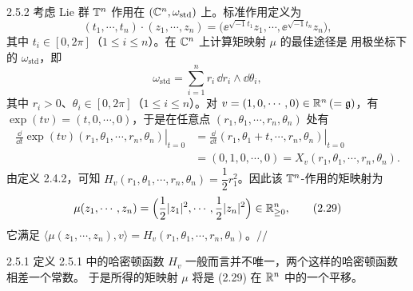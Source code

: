 \begin{wexam}{2.5.2}
考虑 Lie 群 $\mathbb{T}^n$ 作用在 $(\mathbb{C}^n,\omega_{\mathrm{std}})$ 上。标准作用定义为
\begin{equation}
  (t_1,\cdots,t_n)\cdot(z_1,\cdots,z_n)
  =\big(\ee^{\sqrt{-1}t_1}z_1,\cdots,\ee^{\sqrt{-1}t_n}z_n\big),
  \tag{2.27}
\end{equation}
其中 $t_i\in[0,2\pi]$（$1\le i\le n$）。在 $\mathbb{C}^n$ 上计算矩映射 $\mu$ 的最佳途径是
用极坐标下的 $\omega_{\mathrm{std}}$，即
\begin{equation}
  \omega_{\mathrm{std}}=\sum_{i=1}^nr_i\,\dd r_i\wedge\dd\theta_i,
  \tag{2.28}
\end{equation}
其中 $r_i>0$、$\theta_i\in[0,2\pi]$（$1\le i\le n$）。对
$v=(1,0,\cdots,0)\in\mathbb{R}^n\,(=\mathfrak{g})$，有 $\exp(tv)=(t,0,\cdots,0)$，于是在任意点
$(r_1,\theta_1,\cdots,r_n,\theta_n)$ 处有
\begin{align*}
  \left.\frac{\dd}{\dd t}\exp(tv)(r_1,\theta_1,\cdots,r_n,\theta_n)\right|_{t=0}
  &=\left.\frac{\dd}{\dd t}(r_1,\theta_1+t,\cdots,r_n,\theta_n)\right|_{t=0}\\
  &=(0,1,0,\cdots,0)=X_v(r_1,\theta_1,\cdots,r_n,\theta_n).
\end{align*}
由定义 2.4.2，可知 $H_v(r_1,\theta_1,\cdots,r_n,\theta_n)=\dfrac12r_1^2$。因此该
$\mathbb{T}^n$-作用的矩映射为
\begin{equation}
  \mu(z_1,\cdots,z_n)
  =\Big(\frac12|z_1|^2,\cdots,\frac12|z_n|^2\Big)\in\mathbb{R}^n_{\ge0},
  \tag{2.29}
\end{equation}
它满足
$\langle\mu(z_1,\cdots,z_n),v\rangle=H_v(r_1,\theta_1,\cdots,r_n,\theta_n)$。\hfill$//$
\end{wexam}

\begin{wrem}{2.5.1}
定义 2.5.1 中的哈密顿函数 $H_v$ 一般而言并不唯一，两个这样的哈密顿函数相差一个常数。
于是所得的矩映射 $\mu$ 将是 (2.29) 在 $\mathbb{R}^n$ 中的一个平移。
\end{wrem}

